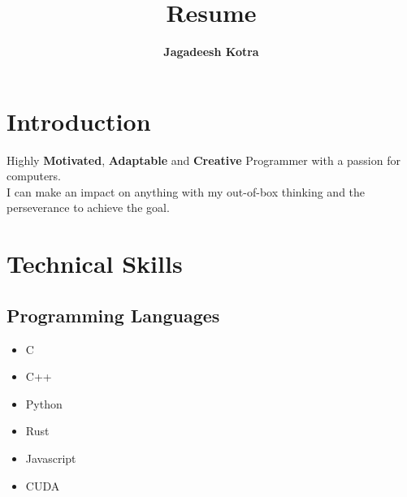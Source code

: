 \documentclass{article}
\date{}
\begin{document}
\title{\LARGE  Resume}
\author{\LARGE \textbf{Jagadeesh Kotra}}
\maketitle

\section{Introduction}

Highly \textbf{Motivated}, \textbf{Adaptable} and \textbf{Creative} Programmer with a passion for computers.\\

I can make an impact on anything with my out-of-box thinking and the perseverance to achieve the goal.

\section{Technical Skills}
\subsection{Programming Languages}
\begin{multicols}{4}
    \begin{itemize}
        \item C
        \item C++
        \item Python
        \item Rust
        \item Javascript
        \item CUDA
    \end{itemize}
\end{multicols}

\iffalse
\subsection{Frameworks}
\begin{multicols}{4}
    \begin{itemize}
        \item React Native
        \item React
        \item GTK
        \item Qt
        \item TensorFlow
        \item Pytorch
        \item Sklearn
        \item Pandas
    \end{itemize}
\end{multicols}
\fi
\end{document}
